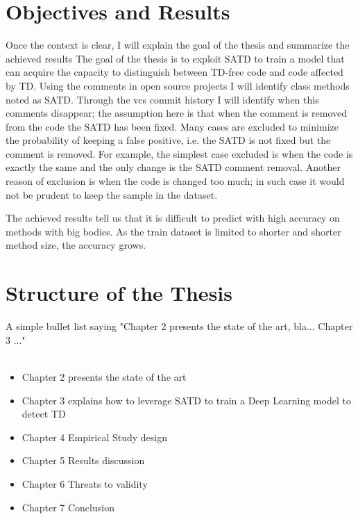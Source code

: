 \section{Objectives and Results}
Once the context is clear, I will explain the goal of the thesis and summarize the achieved results
The goal of the thesis is to exploit SATD to train a model that can acquire the capacity to distinguish between TD-free code and code affected by TD.
Using the comments in open source projects I will identify class methods noted as SATD. Through the vcs commit history I will identify when this comments disappear; the assumption here is that when the comment is removed from the code the SATD has been fixed. Many cases are excluded to minimize the probability of keeping a false positive, i.e. the SATD is not fixed but the comment is removed. For example, the simplest case excluded is when the code is exactly the same and the only change is the SATD comment removal. Another reason of exclusion is when the code is changed too much; in such case it would not be prudent to keep the sample in the dataset.

The achieved results tell us that it is difficult to predict with high accuracy on methods with big bodies. As the train dataset is limited to shorter and shorter method size, the accuracy grows. 
\lipsum[1-1]

\section{Structure of the Thesis}
A simple bullet list saying "Chapter 2 presents the state of the art, bla... Chapter 3 ..."
\\
\\

\begin{itemize}
  \item Chapter 2 presents the state of the art
  \item Chapter 3 explains how to leverage SATD to train a Deep Learning model to detect TD
  \item Chapter 4 Empirical Study design
  \item Chapter 5 Results discussion
  \item Chapter 6 Threats to validity
  \item Chapter 7 Conclusion
\end{itemize}
